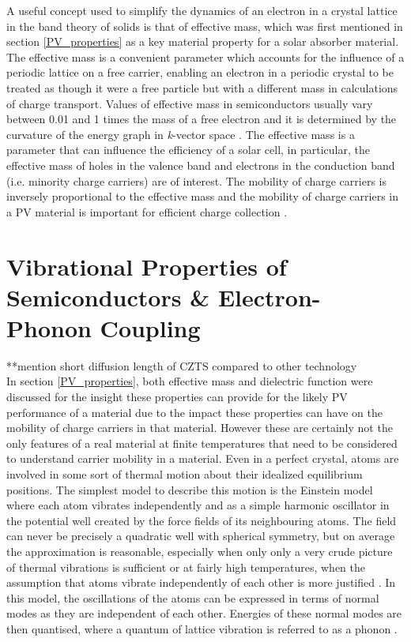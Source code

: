 A useful concept used to simplify the dynamics of an electron in a crystal lattice in the band theory of solids is that of effective mass, which was first mentioned in section \ref{PV_properties} as a key material property for a solar absorber material. The effective mass is a convenient parameter which accounts for the influence of a periodic lattice on a free carrier, enabling an electron in a periodic crystal to be treated as though it were a free particle but with a different mass in calculations of charge transport. Values of effective mass in semiconductors usually vary between 0.01 and 1 times the mass of a free electron and it is determined by the curvature of the energy graph in \textit{k}-vector space \cite{small_semiconductor2}. The effective mass is a parameter that can influence the efficiency of a solar cell, in particular, the effective mass of holes in the valence band and electrons in the conduction band (i.e. minority charge carriers) are of interest. The mobility of charge carriers is inversely proportional to the effective mass and the mobility of charge carriers in a PV material is important for efficient charge collection \cite{transport}.
 
 
 \section{Vibrational Properties of Semiconductors \& Electron-Phonon Coupling}
 
 **mention short diffusion length of CZTS compared to other technology\\
 
In section \ref{PV_properties}, both effective mass and dielectric function were discussed for the insight these properties can provide for the likely PV performance of a material due to the impact these properties can have on the mobility of charge carriers in that material. However these are certainly not the only features of a real material at finite temperatures that need to be considered to understand carrier mobility in a material. 
Even in a perfect crystal, atoms are involved in some sort of thermal motion about their idealized equilibrium positions. The simplest model to describe this motion is the Einstein model where each atom vibrates independently and as a simple harmonic oscillator in the potential well created by the force fields of its neighbouring atoms. The field can never be precisely a quadratic well with spherical symmetry, but on average the approximation is reasonable, especially when only only a very crude picture of thermal vibrations is sufficient or at fairly high temperatures, when the assumption that atoms vibrate independently of each other is more justified \cite{Ziman_solids}. In this model, the oscillations of the atoms can be expressed in terms of normal modes as they are independent of each other. Energies of these normal modes are then quantised, where a quantum of lattice vibration is referred to as a phonon \cite{fund_semi}.\\

